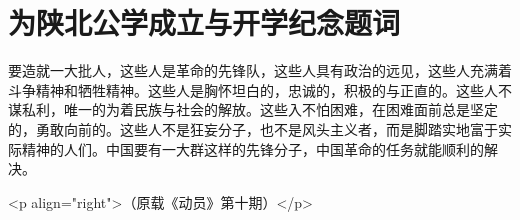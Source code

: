 \section[为陕北公学成立与开学纪念题词（一九三七年十月二十三日）]{为陕北公学成立与开学纪念题词}


要造就一大批人，这些人是革命的先锋队，这些人具有政治的远见，这些人充满着斗争精神和牺牲精神。这些人是胸怀坦白的，忠诚的，积极的与正直的。这些人不谋私利，唯一的为着民族与社会的解放。这些入不怕困难，在困难面前总是坚定的，勇敢向前的。这些人不是狂妄分子，也不是风头主义者，而是脚踏实地富于实际精神的人们。中国要有一大群这样的先锋分子，中国革命的任务就能顺利的解决。

<p align="right">（原载《动员》第十期）</p>

